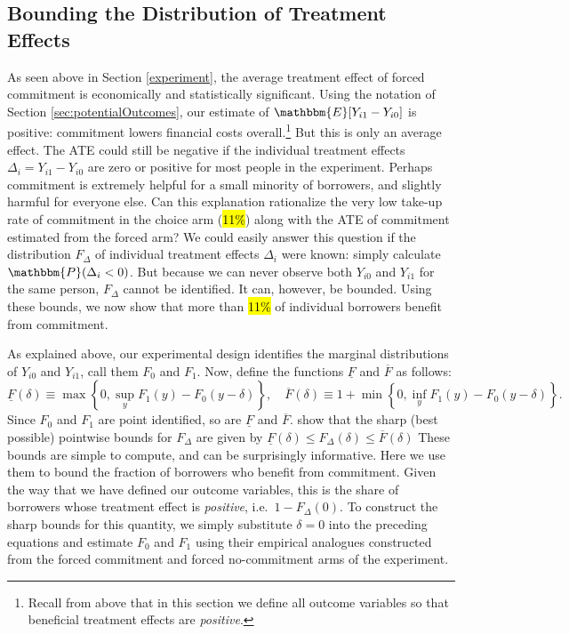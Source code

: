 \documentclass[oneside,11pt]{article}
\begin{document}



\subsection{Bounding the Distribution of Treatment Effects}
As seen above in Section \ref{experiment}, the average treatment effect of forced commitment is economically and statistically significant. 
Using the notation of Section \ref{sec:potentialOutcomes}, our estimate of $\mathbbm{E}[Y_{i1} - Y_{i0}]$ is positive: commitment lowers financial costs overall.\footnote{Recall from above that in this section we define all outcome variables so that beneficial treatment effects are \emph{positive}.}
But this is only an average effect.
The ATE could still be negative if the individual treatment effects $\Delta_i = Y_{i1} - Y_{i0}$ are zero or positive for most people in the experiment.
Perhaps commitment is extremely helpful for a small minority of borrowers, and slightly harmful for everyone else.
Can this explanation rationalize the very low take-up rate of commitment in the choice arm (\hl{11\%}) along with the ATE of commitment estimated from the forced arm? 
We could easily answer this question if the distribution $F_\Delta$ of individual treatment effects $\Delta_i$ were known: simply calculate $\mathbbm{P}(\Delta_i < 0)$.
But because we can never observe both $Y_{i0}$ and $Y_{i1}$ for the same person, $F_\Delta$ cannot be identified. 
It can, however, be bounded. 
Using these bounds, we now show that more than \hl{11\%} of individual borrowers benefit from commitment.

As explained above, our experimental design identifies the marginal distributions of $Y_{i0}$ and $Y_{i1}$, call them $F_0$ and $F_1$.
Now, define the functions $\underline{F}$ and $\overline{F}$ as follows:
\[
\underline{F}(\delta) \equiv \max \left\{0, \sup_y F_1(y) - F_0(y - \delta)  \right\}, \quad
\overline{F}(\delta) \equiv 1 + \min \left\{0, \inf_y F_1(y) - F_0(y-\delta) \right\}.
\]
Since $F_0$ and $F_1$ are point identified, so are $\underline{F}$ and $\overline{F}$.
\cite{fan2010sharp} show that the sharp (best possible) pointwise bounds for $F_\Delta$ are given by $\underline{F}(\delta) \leq F_\Delta(\delta) \leq \overline{F}(\delta)$
These bounds are simple to compute, and can be surprisingly informative. 
Here we use them to bound the fraction of borrowers who benefit from commitment. 
Given the way that we have defined our outcome variables, this is the share of borrowers whose treatment effect is \emph{positive}, i.e.\ $1 - F_\Delta(0)$. 
To construct the sharp bounds for this quantity, we simply substitute $\delta = 0$ into the preceding equations and estimate $F_0$ and $F_1$ using their empirical analogues constructed from the forced commitment and forced no-commitment arms of the experiment.
\end{document}
